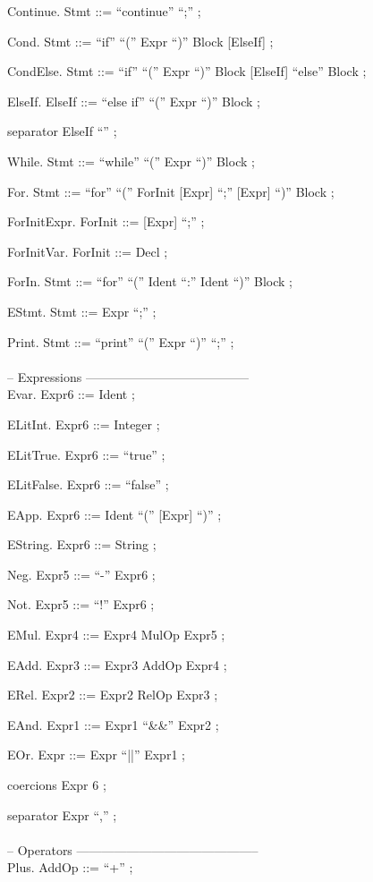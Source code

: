 \documentclass[a4paper]{article}
\begin{document}
Continue. Stmt ::= ``continue'' ``;'' ;

Cond. Stmt ::= ``if'' ``('' Expr ``)'' Block [ElseIf] ;

CondElse. Stmt ::= ``if'' ``('' Expr ``)'' Block [ElseIf] ``else'' Block ;

ElseIf. ElseIf ::= ``else if'' ``('' Expr ``)'' Block ;

separator ElseIf ``'' ;

While. Stmt ::= ``while'' ``('' Expr ``)'' Block ;

For. Stmt ::= ``for'' ``('' ForInit [Expr] ``;'' [Expr] ``)'' Block ;

ForInitExpr. ForInit ::= [Expr] ``;'' ;

ForInitVar. ForInit ::= Decl ;

ForIn. Stmt ::= ``for'' ``('' Ident ``:'' Ident ``)'' Block ; 

EStmt. Stmt ::= Expr ``;'' ;

Print. Stmt ::= ``print'' ``('' Expr ``)'' ``;'' ;
\\\\
\noindent
-- Expressions ---------------------------------------\\

Evar. Expr6 ::= Ident ;

ELitInt. Expr6 ::= Integer ;

ELitTrue. Expr6 ::= ``true'' ;

ELitFalse. Expr6 ::= ``false'' ;

EApp. Expr6 ::= Ident ``('' [Expr] ``)'' ;

EString. Expr6 ::= String ;

Neg. Expr5 ::= ``-'' Expr6 ;

Not. Expr5 ::= ``!'' Expr6 ;

EMul. Expr4 ::= Expr4 MulOp Expr5 ;

EAdd. Expr3 ::= Expr3 AddOp Expr4 ;

ERel. Expr2 ::= Expr2 RelOp Expr3 ;

EAnd. Expr1 ::= Expr1 ``\&\&'' Expr2 ;

EOr. Expr ::= Expr ``||'' Expr1 ;

coercions Expr 6 ;

separator Expr ``,'' ;
\\\\
\noindent
-- Operators --------------------------------------------\\

Plus. AddOp ::= ``+'' ;
\end{document}
